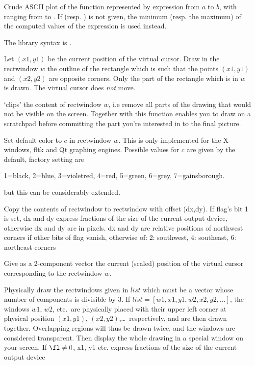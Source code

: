 \label{se:plot}
Crude ASCII plot of the function represented by expression 
from $a$ to $b$, with  ranging from  to . If
 (resp. ) is not given, the minimum (resp. the maximum)
of the computed values of the expression is used instead.

The library syntax is .

\label{se:plotbox}
Let $(x1,y1)$ be the current position of the virtual cursor. Draw in the
rectwindow $w$ the outline of the rectangle which is such that the points
$(x1,y1)$ and $(x2,y2)$ are opposite corners. Only the part of the rectangle
which is in $w$ is drawn. The virtual cursor does \emph{not} move.

\label{se:plotclip}
`clips' the content of rectwindow $w$, i.e remove all parts of the
drawing that would not be visible on the screen. Together with
 this function enables you to draw on a scratchpad before
committing the part you're interested in to the final picture.

\label{se:plotcolor}
Set default color to $c$ in rectwindow $w$.
This is only implemented for the X-windows, fltk and Qt graphing engines.
Possible values for $c$ are given by the  default,
factory setting are

1=black, 2=blue, 3=violetred, 4=red, 5=green, 6=grey, 7=gainsborough.

but this can be considerably extended.

\label{se:plotcopy}
Copy the contents of rectwindow  to rectwindow 
with offset (dx,dy). If flag's bit 1 is set, dx and dy express fractions of
the size of the current output device, otherwise dx and dy are in pixels. dx
and dy are relative positions of northwest corners if other bits of flag
vanish, otherwise of: 2: southwest, 4: southeast, 6: northeast corners

\label{se:plotcursor}
Give as a 2-component vector the current
(scaled) position of the virtual cursor corresponding to the rectwindow $w$.

\label{se:plotdraw}
Physically draw the rectwindows given in $list$
which must be a vector whose number of components is divisible by 3. If
$list=[w1,x1,y1,w2,x2,y2,\dots]$, the windows $w1$, $w2$, etc.~are
physically placed with their upper left corner at physical position
$(x1,y1)$, $(x2,y2)$,\dots\ respectively, and are then drawn together.
Overlapping regions will thus be drawn twice, and the windows are considered
transparent. Then display the whole drawing in a special window on your
screen. If $\fl \neq 0$, x1, y1 etc. express fractions of the size of the
current output device

